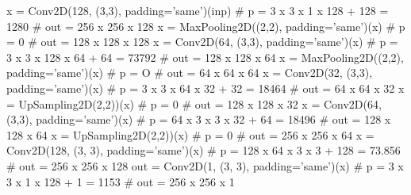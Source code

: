 

\begin{box-stud}
\begin{python}
x = Conv2D(128, (3,3), padding='same')(inp)   # p = 3 x 3 x 1 x 128 + 128 = 1280
                                              # out = 256 x 256 x 128
x = MaxPooling2D((2,2), padding='same')(x)    # p = 0
                                              # out = 128 x 128 x 128
x = Conv2D(64, (3,3), padding='same')(x)      # p = 3 x 3 x 128 x 64 + 64 = 73792
                                              # out = 128 x 128 x 64
x = MaxPooling2D((2,2), padding='same')(x)    # p = O
                                              # out = 64 x 64 x 64
x = Conv2D(32, (3,3), padding='same')(x)      # p = 3 x 3 x 64 x 32 + 32 = 18464
                                              # out = 64 x 64 x 32
x = UpSampling2D(2,2))(x)                     # p = 0
                                              # out = 128 x 128 x 32
x = Conv2D(64, (3,3), padding='same')(x)      # p = 64 x 3 x 3 x 32 + 64 = 18496
                                              # out = 128 x 128 x 64
x = UpSampling2D(2,2))(x)                     # p = 0
                                              # out = 256 x 256 x 64
x = Conv2D(128, (3, 3), padding='same')(x)    # p = 128 x 64 x 3 x 3 + 128 = 73.856
                                              # out = 256 x 256 x 128
out = Conv2D(1, (3, 3), padding='same')(x)    # p = 3 x 3 x 1 x 128 + 1 = 1153
                                              # out = 256 x 256 x 1
\end{python}
\end{box-stud}



